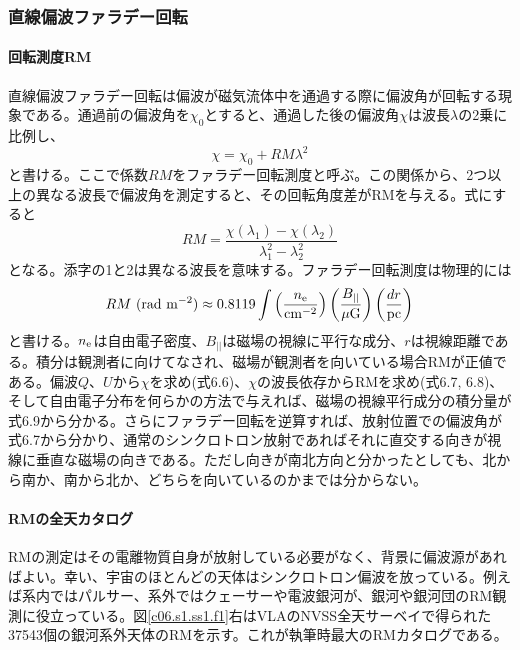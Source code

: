 \subsubsection{直線偏波ファラデー回転}
\label{c06.s1.ss1.sss2}

\paragraph{回転測度RM}

直線偏波ファラデー回転は偏波が磁気流体中を通過する際に偏波角が回転する現象である。通過前の偏波角を$\chi_0$とすると、通過した後の偏波角$\chi$は波長$\lambda$の2乗に比例し、
\begin{equation}
\chi=\chi_0+RM\lambda^2
\end{equation}
と書ける。ここで係数$RM$をファラデー回転測度と呼ぶ。この関係から、2つ以上の異なる波長で偏波角を測定すると、その回転角度差がRMを与える。式にすると
\begin{equation}
RM =\frac{\chi(\lambda_1)-\chi(\lambda_2)}{\lambda_1^2-\lambda_2^2}
\end{equation}
となる。添字の1と2は異なる波長を意味する。ファラデー回転測度は物理的には
\begin{equation}
RM~({\rm rad~m^{-2}}) \approx 0.8119 \int 
\left(\frac{n_{\rm e}}{\rm cm^{-2}}\right)
\left(\frac{B_{||}}{\rm \mu G}\right)
\left(\frac{dr}{\rm pc}\right)
\end{equation}
と書ける。$n_{\rm e}$は自由電子密度、$B_{||}$は磁場の視線に平行な成分、$r$は視線距離である。積分は観測者に向けてなされ、磁場が観測者を向いている場合RMが正値である。偏波$Q$、$U$から$\chi$を求め(式6.6)、$\chi$の波長依存からRMを求め(式6.7, 6.8)、そして自由電子分布を何らかの方法で与えれば、磁場の視線平行成分の積分量が式6.9から分かる。さらにファラデー回転を逆算すれば、放射位置での偏波角が式6.7から分かり、通常のシンクロトロン放射であればそれに直交する向きが視線に垂直な磁場の向きである。ただし向きが南北方向と分かったとしても、北から南か、南から北か、どちらを向いているのかまでは分からない。

\paragraph{RMの全天カタログ}

RMの測定はその電離物質自身が放射している必要がなく、背景に偏波源があればよい。幸い、宇宙のほとんどの天体はシンクロトロン偏波を放っている。例えば系内ではパルサー、系外ではクェーサーや電波銀河が、銀河や銀河団のRM観測に役立っている。図\ref{c06.s1.ss1.f1}右はVLAのNVSS全天サーベイで得られた37543個の銀河系外天体のRMを示す\citep{2009ApJ...702.1230T}。これが執筆時最大のRMカタログである。

